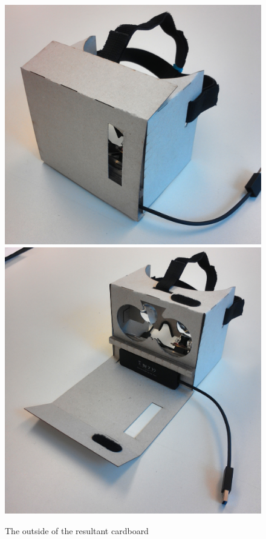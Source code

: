 \documentclass[../../Cardboard_Assembling]{subfiles}
\begin{document}
\begin{figure}[htb]
		\centering
		\includegraphics[width=0.55\linewidth]{finalCardboard02}\\ \vspace{1mm}
		\includegraphics[width=0.55\linewidth]{finalCardboard03}
		\caption{The outside of the resultant cardboard}
		\label{fig:screenshot031}
	\end{figure}
\end{document}
